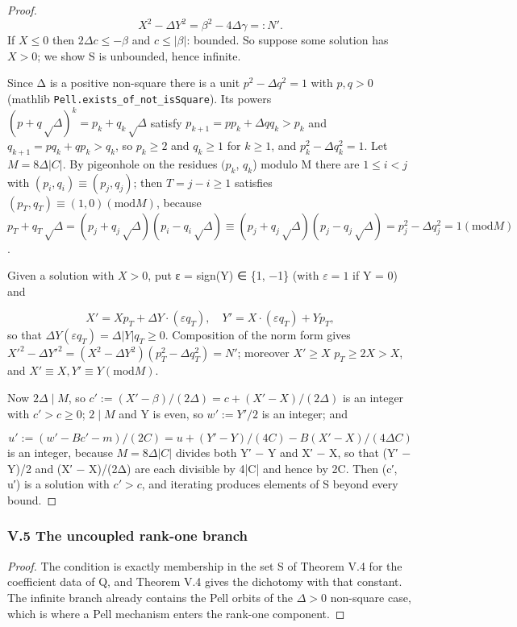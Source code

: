 \begin{proof}
\[
X^{2} − ΔY^{2} = β^{2} − 4Δγ =: N′.
\]
If $X ≤ 0$ then $2Δc ≤ −β$ and $c ≤ |β|$: bounded. So suppose some solution has $X > 0$; we show S is unbounded, hence infinite.

Since Δ is a positive non-square there is a unit $p^{2} − Δq^{2} = 1$ with $p, q > 0$ (mathlib \texttt{Pell.\allowbreak{}exists\_\allowbreak{}of\_\allowbreak{}not\_\allowbreak{}isSquare}). Its powers $(p + q√Δ)^{k} = p_{k} + q_{k}√Δ$ satisfy $p_{k+1} = p p_{k} + Δ q q_{k} > p_{k}$ and $q_{k+1} = p q_{k} + q p_{k} > q_{k}$, so $p_{k} ≥ 2$ and $q_{k} ≥ 1$ for $k ≥ 1$, and $p_{k}^{2} − Δq_{k}^{2} = 1$. Let $M = 8Δ|C|$. By pigeonhole on the residues $(p_{k}$, $q_{k}$) modulo M there are $1 ≤ i < j$ with $(p_{i}, q_{i}) ≡ (p_{j}, q_{j})$; then $T = j − i ≥ 1$ satisfies $(p_{T}, q_{T}) ≡ (1, 0) (\mathrm{mod} M)$, because $p_{T} + q_{T}√Δ = (p_{j} + q_{j}√Δ)(p_{i} − q_{i}√Δ) ≡ (p_{j} + q_{j}√Δ)(p_{j} − q_{j}√Δ) = p_{j}^{2} − Δq_{j}^{2} = 1 (\mathrm{mod} M)$.

Given a solution with $X > 0$, put ε = sign(Y) ∈ \{1, −1\} (with $ε = 1$ if Y = 0) and

\[
X′ = X p_{T} + ΔY·(εq_{T}), \quad Y′ = X·(εq_{T}) + Y p_{T},
\]
so that $ΔY(εq_{T}) = Δ|Y|q_{T} ≥ 0$. Composition of the norm form gives $X′^{2} − ΔY′^{2} = (X^{2} − ΔY^{2})(p_{T}^{2} − Δq_{T}^{2}) = N′$; moreover $X′ ≥ X$ $p_{T} ≥ 2X > X$, and $X′ ≡ X, Y′ ≡ Y (\mathrm{mod} M)$.

Now $2Δ ∣ M$, so $c′ := (X′ − β)/(2Δ) = c + (X′ − X)/(2Δ)$ is an integer with $c′ > c ≥ 0$; $2 ∣ M$ and Y is even, so $w′ := Y′/2$ is an integer; and

\[
u′ := (w′ − Bc′ − m)/(2C) = u + (Y′ − Y)/(4C) − B(X′ − X)/(4ΔC)
\]
is an integer, because $M = 8Δ|C|$ divides both Y′ − Y and X′ − X, so that (Y′ − Y)/2 and (X′ − X)/(2Δ) are each divisible by 4|C| and hence by 2C. Then (c′, u′) is a solution with $c′ > c$, and iterating produces elements of S beyond every bound.

\end{proof}
\subsubsection*{V.5 The uncoupled rank-one branch}
\begin{proof}
The condition is exactly membership in the set S of Theorem V.4 for the coefficient data of Q, and Theorem V.4 gives the dichotomy with that constant. The infinite branch already contains the Pell orbits of the $Δ > 0$ non-square case, which is where a Pell mechanism enters the rank-one component.
\end{proof}
